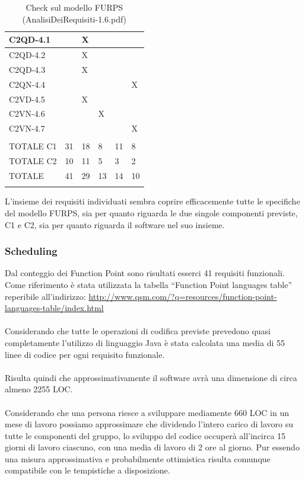 \begin{footnotesize}
\begin{longtable}{|p{}|p{}|p{}|p{}|p{}|p{}|}
 C2QD-4.1& &  X&  &  &  \\ \hline
 C2QD-4.2& &  X&  &  &  \\ \hline
 C2QD-4.3& &  X&  &  &  \\ \hline
 C2QN-4.4& &  &  &  &  X\\ \hline
 C2VD-4.5& &  X&  &  &  \\ \hline
 C2VN-4.6& &  &  X&  &  \\ \hline
 C2VN-4.7& &  &  &  &  X\\ \hline
         & &  &  &  &  \\ \hline
 TOTALE C1& 31&  18&  8&  11&  8\\ \hline
 TOTALE C2& 10&  11&  5&  3&  2\\ \hline
 TOTALE& 41&  29&  13&  14&  10\\ \hline
\caption{Check sul modello FURPS (AnalisiDeiRequisiti-1.6.pdf)}
\end{longtable}
\end{footnotesize}

L'insieme dei requisiti individuati sembra coprire efficacemente tutte le
specifiche del modello FURPS, sia per quanto riguarda le due singole componenti
previste, C1 e C2, sia per quanto riguarda il software nel suo insieme.

\subsubsection*{Scheduling}

Dal conteggio dei Function Point sono risultati esserci 41 requisiti
funzionali. Come riferimento \`e stata utilizzata la tabella ``Function Point
languages table'' reperibile all'indirizzo:
\url{http://www.qsm.com/?q=resources/function-point-languages-table/index.html}
\\\\
Considerando che tutte le operazioni di codifica previste prevedono quasi
completamente l'utilizzo di linguaggio Java \`e stata calcolata una media di 55
linee di codice per ogni requisito funzionale.
\\\\
Risulta quindi che approssimativamente il software avr\`a una dimensione di
circa almeno 2255 LOC.
\\\\
Considerando che una persona riesce a sviluppare mediamente 660 LOC in un mese
di lavoro possiamo approssimare che dividendo l'intero carico di lavoro su tutte le
componenti del gruppo, lo sviluppo del codice occuper\`a all'incirca
15 giorni di lavoro ciascuno, con una media di lavoro di 2 ore al giorno. Pur
essendo una misura approssimativa e probabilmente ottimistica risulta comunque
compatibile con le tempistiche a disposizione.

